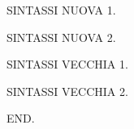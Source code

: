 \documentclass[a4paper]{article}
\begin{document}
\htmlcut

\Unit SINTASSI NUOVA 1.

\Figskip{{2cm}}

\Unit SINTASSI NUOVA 2.


\Unit SINTASSI VECCHIA 1.

\Figskip{2cm}

\Unit SINTASSI VECCHIA 2.


\Unit END.
\end{document}
